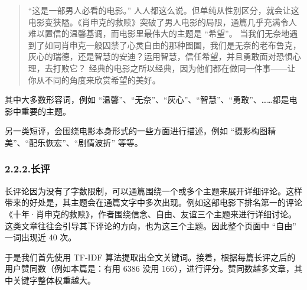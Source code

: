 \documentclass[10pt]{article}
\begin{document}
\begin{quote}%

\noindent{}“这是一部男人必看的电影。” 人人都这么说。但单纯从性别区分，就会让这电影变狭隘。《肖申克的救赎》突破了男人电影的局限，通篇几乎充满令人难以置信的温馨基调，而电影里最伟大的主题是 “希望”。 当我们无奈地遇到了如同肖申克一般囚禁了心灵自由的那种囹圄，我们是无奈的老布鲁克，灰心的瑞德，还是智慧的安迪？运用智慧，信任希望，并且勇敢面对恐惧心理，去打败它？ 经典的电影之所以经典，因为他们都在做同一件事——让你从不同的角度来欣赏希望的美好。%
\end{quote}%

\noindent{}其中大多数形容词，例如 \textquotedblleft{}温馨\textquotedblright{}、\textquotedblleft{}无奈\textquotedblright{}、\textquotedblleft{}灰心\textquotedblright{}、\textquotedblleft{}智慧\textquotedblright{}、\textquotedblleft{}勇敢\textquotedblright{}、……都是电影中重要的主题。%

另一类短评，会围绕电影本身形式的一些方面进行描述，例如 \textquotedblleft{}摄影构图精美\textquotedblright{}、\textquotedblleft{}配乐恢宏\textquotedblright{}、\textquotedblleft{}剧情波折\textquotedblright{} 等等。%

\subsubsection{2.2.2.\hspace*{0.5em}长评}\label{section}%

\noindent{}长评论因为没有了字数限制，可以通篇围绕一个或多个主题来展开详细评论。这样带来的好处是，其主题会在通篇文字中多次出现。例如这部电影下排名第一的评论《十年·肖申克的救赎》，作者围绕信念、自由、友谊三个主题来进行详细讨论。这类文章往往会引导其下评论的方向，也为这三个主题。因此整个页面中 \textquotedblleft{}自由\textquotedblright{} 一词出现近 40 次。%

于是我们首先使用 TF-IDF 算法提取出全文关键词。接着，根据每篇长评之后的用户赞同数（例如本篇是：有用 6386 没用 166），进行评分。赞同数越多文章，其中关键字整体权重越大。%
\end{document}
